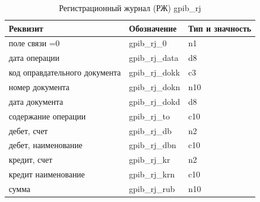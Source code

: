 
\begin{table}[!htbp]
    \centering
    \scriptsize
    \caption{Регистрационный журнал (РЖ) gpib\_rj}
    \begin{tabular}{|l|l|l|} 

                                                                                       \hline
\textbf{Реквизит}               &\textbf{Обозначение}   &\textbf{Тип и значность}   \\ \hline
поле связи =0                   &gpib\_rj\_0            &n1                         \\ \hline
дата операции                   &gpib\_rj\_data         &d8                         \\ \hline
код оправдательного документа   &gpib\_rj\_dokk         &c3                         \\ \hline
номер документа                 &gpib\_rj\_dokn         &n10                        \\ \hline
дата документа                  &gpib\_rj\_dokd         &d8                         \\ \hline
содержание операции             &gpib\_rj\_to           &c10                        \\ \hline
дебет, счет                     &gpib\_rj\_db           &n2                         \\ \hline
дебет, наименование             &gpib\_rj\_dbn          &c10                        \\ \hline
кредит, счет                    &gpib\_rj\_kr           &n2                         \\ \hline
кредит наименование             &gpib\_rj\_krn          &c10                        \\ \hline
сумма                           &gpib\_rj\_rub          &n10                        \\ \hline

    \end{tabular}
\end{table}

